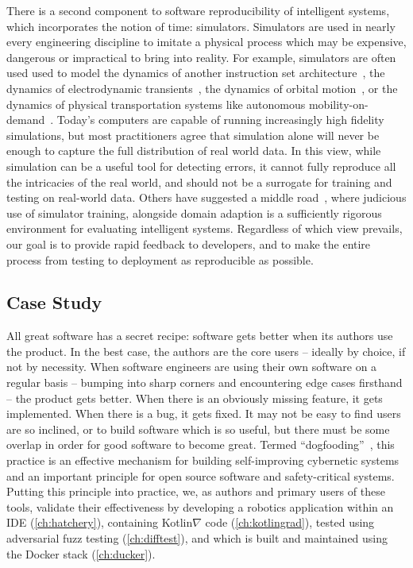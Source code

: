 \documentclass[12pt,initial,twoside,maitrise]{dms}
\numberwithin{equation}{section}
\numberwithin{table}{chapter}
\numberwithin{figure}{chapter}
\begin{document}
There is a second component to software reproducibility of intelligent systems, which incorporates the notion of time: simulators. Simulators are used in nearly every engineering discipline to imitate a physical process which may be expensive, dangerous or impractical to bring into reality. For example, simulators are often used used to model the dynamics of another instruction set architecture~\citep{bellard2005qemu}, the dynamics of electrodynamic transients~\citep{tavante2018opensi}, the dynamics of orbital motion~\citep{bellman1965wengert}, or the dynamics of physical transportation systems like autonomous mobility-on-demand~\citep{ruch2018amodeus}. Today's computers are capable of running increasingly high fidelity simulations, but most practitioners agree that simulation alone will never be enough to capture the full distribution of real world data. In this view, while simulation can be a useful tool for detecting errors, it cannot fully reproduce all the intricacies of the real world, and should not be a surrogate for training and testing on real-world data. Others have suggested a middle road~\citep{bousmalis2018using}, where judicious use of simulator training, alongside domain adaption is a sufficiently rigorous environment for evaluating intelligent systems. Regardless of which view prevails, our goal is to provide rapid feedback to developers, and to make the entire process from testing to deployment as reproducible as possible.

\subsection{Case Study}\label{subsec:case-study}

All great software has a secret recipe: software gets better when its authors use the product. In the best case, the authors are the core users -- ideally by choice, if not by necessity. When software engineers are using their own software on a regular basis -- bumping into sharp corners and encountering edge cases firsthand -- the product gets better. When there is an obviously missing feature, it gets implemented. When there is a bug, it gets fixed. It may not be easy to find users are so inclined, or to build software which is so useful, but there must be some overlap in order for good software to become great. Termed ``dogfooding''~\citep{harrison2006eating}, this practice is an effective mechanism for building self-improving cybernetic systems and an important principle for open source software and safety-critical systems. Putting this principle into practice, we, as authors and primary users of these tools, validate their effectiveness by developing a robotics application within an IDE (\autoref{ch:hatchery}), containing Kotlin$\nabla$ code (\autoref{ch:kotlingrad}), tested using adversarial fuzz testing (\autoref{ch:difftest}), and which is built and maintained using the Docker stack (\autoref{ch:ducker}).
\end{document}
